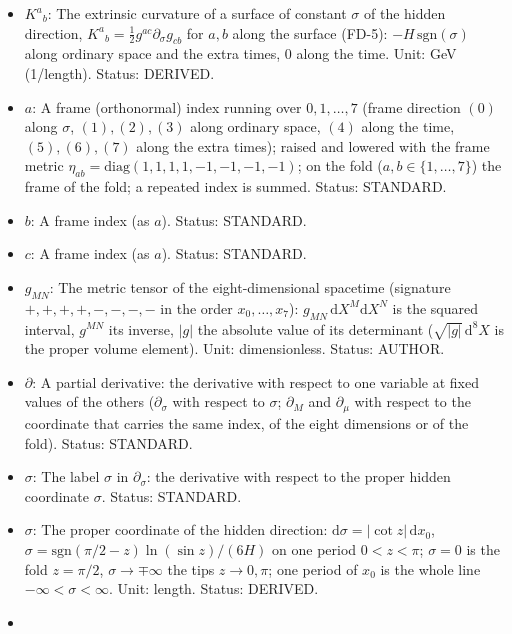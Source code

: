 \documentclass[
  10pt,
]{article}
\providecommand{\tightlist}{%
  \setlength{\itemsep}{0pt}\setlength{\parskip}{0pt}}
\begin{document}
\begin{itemize}
\tightlist
\item
  \(K^a{}_b\): The extrinsic curvature of a surface of constant
  \(\sigma\) of the hidden direction,
  \(K^a{}_b = \frac12 g^{ac}\partial_\sigma g_{cb}\) for \(a, b\) along
  the surface (FD-5): \(-H\,\mathrm{sgn}(\sigma)\) along ordinary space
  and the extra times, 0 along the time. Unit: GeV (1/length). Status:
  DERIVED.
\item
  \(a\): A frame (orthonormal) index running over \(0, 1, \dots, 7\)
  (frame direction \((0)\) along \(\sigma\), \((1), (2), (3)\) along
  ordinary space, \((4)\) along the time, \((5), (6), (7)\) along the
  extra times); raised and lowered with the frame metric
  \(\eta_{ab} = \mathrm{diag}(1, 1, 1, 1, -1, -1, -1, -1)\); on the fold
  (\(a, b \in \{1, \dots, 7\}\)) the frame of the fold; a repeated index
  is summed. Status: STANDARD.
\item
  \(b\): A frame index (as \(a\)). Status: STANDARD.
\item
  \(c\): A frame index (as \(a\)). Status: STANDARD.
\item
  \(g_{MN}\): The metric tensor of the eight-dimensional spacetime
  (signature \(+,+,+,+,-,-,-,-\) in the order \(x_0, \dots, x_7\)):
  \(g_{MN}\,\mathrm{d}X^M\mathrm{d}X^N\) is the squared interval,
  \(g^{MN}\) its inverse, \(\lvert g\rvert\) the absolute value of its
  determinant (\(\sqrt{\lvert g\rvert}\,\mathrm{d}^8X\) is the proper
  volume element). Unit: dimensionless. Status: AUTHOR.
\item
  \(\partial\): A partial derivative: the derivative with respect to one
  variable at fixed values of the others (\(\partial_\sigma\) with
  respect to \(\sigma\); \(\partial_M\) and \(\partial_\mu\) with
  respect to the coordinate that carries the same index, of the eight
  dimensions or of the fold). Status: STANDARD.
\item
  \(\sigma\): The label \(\sigma\) in \(\partial_\sigma\): the
  derivative with respect to the proper hidden coordinate \(\sigma\).
  Status: STANDARD.
\item
  \(\sigma\): The proper coordinate of the hidden direction:
  \(\mathrm{d}\sigma = \lvert\cot z\rvert\,\mathrm{d}x_0\),
  \(\sigma = \mathrm{sgn}(\pi/2 - z)\ln(\sin z)/(6H)\) on one period
  \(0 < z < \pi\); \(\sigma = 0\) is the fold \(z = \pi/2\),
  \(\sigma \to \mp\infty\) the tips \(z \to 0, \pi\); one period of
  \(x_0\) is the whole line \(-\infty < \sigma < \infty\). Unit: length.
  Status: DERIVED.
\item

\end{itemize}
\end{document}
